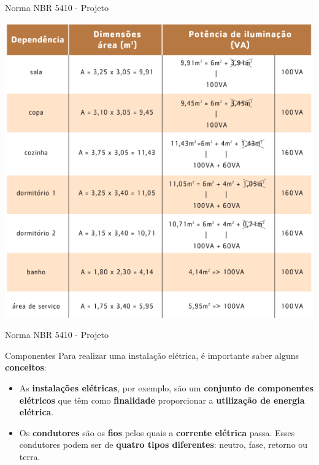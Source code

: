 \begin{frame}{Norma NBR 5410 - Projeto}

	\centering
	\includegraphics[height=0.9\textheight]{Figuras/Ch02/fig2}

\end{frame}


\begin{frame}{Norma NBR 5410 - Projeto}
	\begin{block}{Componentes}
		Para realizar uma instalação elétrica, é importante saber alguns \textbf{conceitos}:
		\vspace{-0.45cm}
		\begin{itemize}
			\item As \textbf{instalações elétricas}, por exemplo, são um \textbf{conjunto de componentes elétricos} que têm como \textbf{finalidade} proporcionar a \textbf{utilização de energia elétrica}.
			\item Os \textbf{condutores} são os \textbf{fios} pelos quais a \textbf{corrente elétrica} passa. Esses condutores podem ser de \textbf{quatro tipos diferentes}: neutro, fase, retorno ou terra.
		\end{itemize}
	\end{block}
\end{frame}


